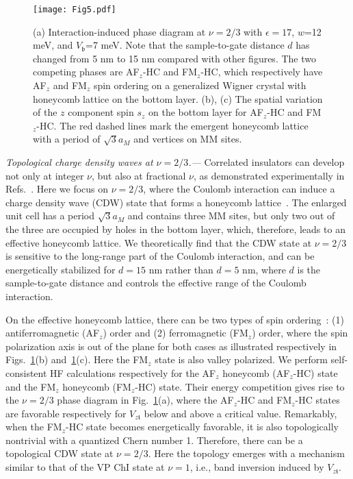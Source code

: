 \documentclass[aps,prl,twocolumn,superscriptaddress,longbibliography]{revtex4-2}
\begin{document}
\begin{figure}[t]
    \centering
    \texttt{[image: Fig5.pdf]}
    \caption{(a) Interaction-induced phase diagram at $\nu=2/3$ with $\epsilon=17$, $w$=12 meV, and $V_\mathfrak{b}$=7 meV. Note that the sample-to-gate distance $d$ has changed from 5 nm to 15 nm compared with other figures. The two competing phases are  AF$_z$-HC and FM$_z$-HC, which respectively have AF$_z$ and FM$_z$ spin ordering on a generalized Wigner crystal with honeycomb lattice on the bottom layer. (b), (c) The spatial variation of the $z$ component spin $s_z$ on the bottom layer for AF$_z$-HC and FM$_z$-HC. The red dashed lines mark the emergent honeycomb lattice with a period of $\sqrt{3} a_M$ and vertices on MM sites.}
    \label{fig:5}
\end{figure}


\textit{Topological charge density waves at $\nu=2/3$.---}
Correlated insulators can develop not only at integer $\nu$, but also at fractional $\nu$, as demonstrated experimentally in Refs.~.  Here we focus on $\nu=2/3$, where the Coulomb interaction can induce a charge density wave (CDW) state that forms a honeycomb lattice~\cite{pan2020quantum}. The enlarged unit cell has a period $\sqrt{3} a_M$ and contains three MM sites, but only two out of the three are occupied by holes in the bottom layer, which, therefore, leads to an effective honeycomb lattice. We theoretically find that the CDW state at $\nu=2/3$ is sensitive to the long-range part of the Coulomb interaction, and can be energetically stabilized for $d=15$ nm rather than $d=5$ nm, where $d$ is the sample-to-gate distance and controls the effective range of the Coulomb interaction. 

On the effective honeycomb lattice, there can be two types of spin ordering~\cite{pan2020quantum}: (1) antiferromagnetic (AF$_z$) order and (2) ferromagnetic (FM$_z$) order, where the spin polarization axis is out of the plane for both cases as illustrated respectively in Figs.~\ref{fig:5}(b) and~\ref{fig:5}(c). Here the FM$_z$ state is also valley polarized.  We perform self-consistent HF calculations respectively for the AF$_z$ honeycomb (AF$_z$-HC) state and the FM$_z$ honeycomb (FM$_z$-HC) state. Their energy competition gives rise to the $\nu=2/3$ phase diagram in Fig.~\ref{fig:5}(a), where the AF$_z$-HC and FM$_z$-HC states are favorable respectively for $V_{z\mathfrak{t}}$ below and above a critical value. Remarkably, when the FM$_z$-HC state becomes energetically favorable, it is also topologically nontrivial with a quantized Chern number 1. Therefore, there can be a topological CDW state at $\nu=2/3$.  Here the topology emerges with a mechanism similar to that of the VP ChI state at $\nu=1$, i.e., band inversion induced by $V_{z\mathfrak{t}}$. 
\end{document}
